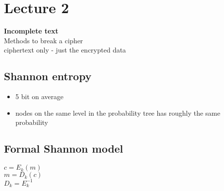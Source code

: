 \section{Lecture 2}
\textbf{Incomplete text}\\
Methods to break a cipher\\

ciphertext only - just the encrypted data


\subsection{Shannon entropy}
\begin{itemize}
   \item 5 bit on average
   \item nodes on the same level in the probability tree has roughly the same probability
\end{itemize}

\subsection{Formal Shannon model}
       \(c = E_k(m)\)\\
       \(m = D_k(c)\)\\
       \(D_k = E_k^{-1}\)\\
